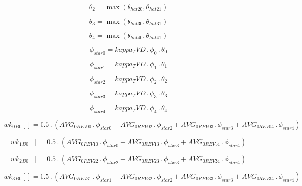 \documentclass{article}
\begin{document}
\begin{dmath}\theta_{2} = \max\left(\theta_{hat 20}, \theta_{hat 21}\right)\end{dmath}

\begin{dmath}\theta_{3} = \max\left(\theta_{hat 30}, \theta_{hat 31}\right)\end{dmath}

\begin{dmath}\theta_{4} = \max\left(\theta_{hat 40}, \theta_{hat 41}\right)\end{dmath}

\begin{dmath}\phi_{star 0} = kappa_TVD \,.\, \phi_{0} \,.\, \theta_{0}\end{dmath}

\begin{dmath}\phi_{star 1} = kappa_TVD \,.\, \phi_{1} \,.\, \theta_{1}\end{dmath}

\begin{dmath}\phi_{star 2} = kappa_TVD \,.\, \phi_{2} \,.\, \theta_{2}\end{dmath}

\begin{dmath}\phi_{star 3} = kappa_TVD \,.\, \phi_{3} \,.\, \theta_{3}\end{dmath}

\begin{dmath}\phi_{star 4} = kappa_TVD \,.\, \phi_{4} \,.\, \theta_{4}\end{dmath}

\begin{dmath}{wk_{0}{_{B0}}}[{}] = 0.5 \,.\, \left(AVG_{0 REV 00} \,.\, \phi_{star 0} + AVG_{0 REV 02} \,.\, \phi_{star 2} + AVG_{0 REV 03} \,.\, \phi_{star 3} + AVG_{0 REV 04} \,.\, \phi_{star 4}\right)\end{dmath}

\begin{dmath}{wk_{1}{_{B0}}}[{}] = 0.5 \,.\, \left(AVG_{0 REV 10} \,.\, \phi_{star 0} + AVG_{0 REV 13} \,.\, \phi_{star 3} + AVG_{0 REV 14} \,.\, \phi_{star 4}\right)\end{dmath}

\begin{dmath}{wk_{2}{_{B0}}}[{}] = 0.5 \,.\, \left(AVG_{0 REV 22} \,.\, \phi_{star 2} + AVG_{0 REV 23} \,.\, \phi_{star 3} + AVG_{0 REV 24} \,.\, \phi_{star 4}\right)\end{dmath}

\begin{dmath}{wk_{3}{_{B0}}}[{}] = 0.5 \,.\, \left(AVG_{0 REV 31} \,.\, \phi_{star 1} + AVG_{0 REV 32} \,.\, \phi_{star 2} + AVG_{0 REV 33} \,.\, \phi_{star 3} + AVG_{0 REV 34} \,.\, \phi_{star 4}\right)\end{dmath}
\end{document}

